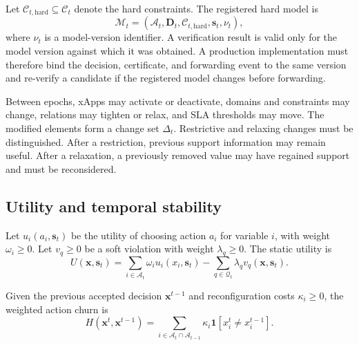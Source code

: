 \documentclass[pdflatex,sn-mathphys-num,iicol,oneside]{sn-jnl}
\begin{document}
Let
$\mathcal{C}_{t,\mathrm{hard}}\subseteq\mathcal{C}_t$
denote the hard constraints. The registered hard model is
\begin{equation}
\mathcal{M}_t=
\left(
\mathcal{A}_t,
\bm{D}_t,
\mathcal{C}_{t,\mathrm{hard}},
\bm{s}_t,
\nu_t
\right),
\label{eq:model}
\end{equation}
where $\nu_t$ is a model-version identifier. A verification result is
valid only for the model version against which it was obtained. A
production implementation must therefore bind the decision,
certificate, and forwarding event to the same version and re-verify a
candidate if the registered model changes before forwarding.

Between epochs, xApps may activate or deactivate, domains and
constraints may change, relations may tighten or relax, and SLA
thresholds may move. The modified elements form a change set
$\Delta_t$. Restrictive and relaxing changes must be distinguished.
After a restriction, previous support information may remain useful.
After a relaxation, a previously removed value may have regained
support and must be reconsidered.

\subsection{Utility and temporal stability}

Let $u_i(a_i,\bm{s}_t)$ be the utility of choosing action $a_i$ for
variable $i$, with weight $\omega_i\geq 0$. Let $v_q\geq 0$ be a soft
violation with weight $\lambda_q\geq 0$. The static utility is
\begin{equation}
U(\bm{x},\bm{s}_t)
=
\sum_{i\in\mathcal{A}_t}
\omega_i u_i(x_i,\bm{s}_t)
-
\sum_{q\in\mathcal{Q}_t}
\lambda_q v_q(\bm{x},\bm{s}_t).
\label{eq:static-utility}
\end{equation}

Given the previous accepted decision $\bm{x}^{t-1}$ and
reconfiguration costs $\kappa_i\geq 0$, the weighted action churn is
\begin{equation}
H(\bm{x}^{t},\bm{x}^{t-1})
=
\sum_{i\in\mathcal{A}_t\cap\mathcal{A}_{t-1}}
\kappa_i
\mathbf{1}
\left[
x_i^t\neq x_i^{t-1}
\right].
\label{eq:churn}
\end{equation}
\end{document}
